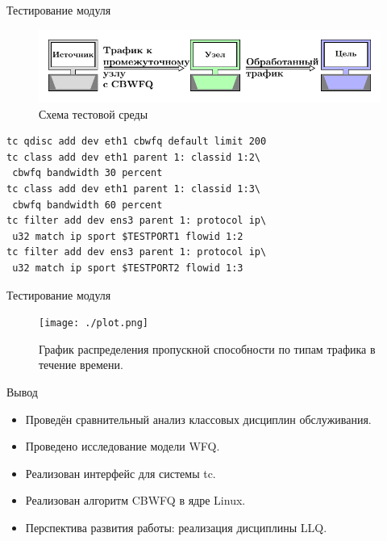 \documentclass[12pt]{beamer}
\begin{document}
\begin{frame}[fragile]{Тестирование модуля}
	\begin{figure}
		\center
    	\includegraphics[scale=0.7]{../text/src/pdfimages/test_scheme.pdf}
		\caption*{{\footnotesize Схема тестовой среды}}
	\end{figure}
{\footnotesize
	\begin{lstlisting}[frame=single]
tc qdisc add dev eth1 cbwfq default limit 200
tc class add dev eth1 parent 1: classid 1:2\
 cbwfq bandwidth 30 percent  
tc class add dev eth1 parent 1: classid 1:3\
 cbwfq bandwidth 60 percent  
tc filter add dev ens3 parent 1: protocol ip\
 u32 match ip sport $TESTPORT1 flowid 1:2
tc filter add dev ens3 parent 1: protocol ip\
 u32 match ip sport $TESTPORT2 flowid 1:3
    \end{lstlisting}
}
\end{frame}

\begin{frame}{Тестирование модуля}
	\begin{figure}
		\center
    	\texttt{[image: ./plot.png]}
		\caption*{{\footnotesize График распределения пропускной способности по типам трафика в течение времени.}}
	\end{figure}
\end{frame}

\begin{frame}{Вывод}
	\begin{itemize}
		\item Проведён сравнительный анализ классовых дисциплин обслуживания.
		\item Проведено исследование модели WFQ.
		\item Реализован интерфейс для системы tc.
		\item Реализован алгоритм CBWFQ в ядре Linux.
		\item Перспектива развития работы: реализация дисциплины LLQ.
	\end{itemize}
\end{frame}

\itmothankyou
\end{document}
